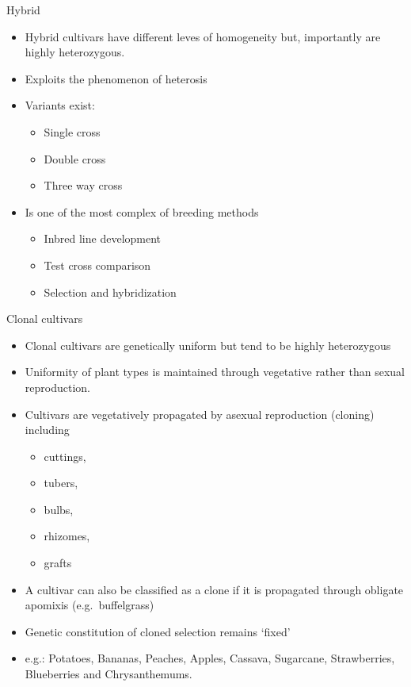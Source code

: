 \documentclass[11pt,ignorenonframetext,aspectratio=169]{beamer}
\providecommand{\tightlist}{%
  \setlength{\itemsep}{0pt}\setlength{\parskip}{0pt}}
\begin{document}
\begin{frame}{Hybrid}
\protect\hypertarget{hybrid}{}
\begin{itemize}
\tightlist
\item
  Hybrid cultivars have different leves of homogeneity but, importantly
  are highly heterozygous.
\item
  Exploits the phenomenon of heterosis
\item
  Variants exist:

  \begin{itemize}
  \tightlist
  \item
    Single cross
  \item
    Double cross
  \item
    Three way cross
  \end{itemize}
\item
  Is one of the most complex of breeding methods

  \begin{itemize}
  \tightlist
  \item
    Inbred line development
  \item
    Test cross comparison
  \item
    Selection and hybridization
  \end{itemize}
\end{itemize}
\end{frame}

\begin{frame}{Clonal cultivars}
\protect\hypertarget{clonal-cultivars}{}
\begin{itemize}
\tightlist
\item
  Clonal cultivars are genetically uniform but tend to be highly
  heterozygous
\item
  Uniformity of plant types is maintained through vegetative rather than
  sexual reproduction.
\item
  Cultivars are vegetatively propagated by asexual reproduction
  (cloning) including

  \begin{itemize}
  \tightlist
  \item
    cuttings,
  \item
    tubers,
  \item
    bulbs,
  \item
    rhizomes,
  \item
    grafts
  \end{itemize}
\item
  A cultivar can also be classified as a clone if it is propagated
  through obligate apomixis (e.g.~buffelgrass)
\item
  Genetic constitution of cloned selection remains `fixed'
\item
  e.g.: Potatoes, Bananas, Peaches, Apples, Cassava, Sugarcane,
  Strawberries, Blueberries and Chrysanthemums.
\end{itemize}
\end{frame}
\end{document}
